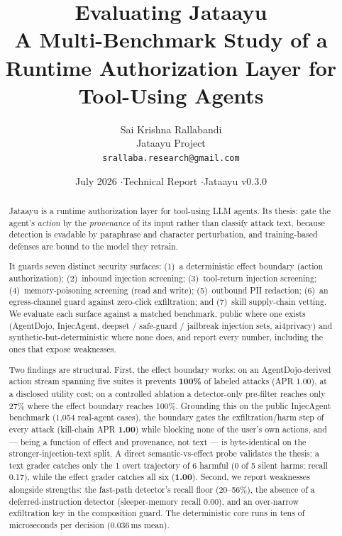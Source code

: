 \documentclass[11pt]{article}
\title{\vspace{-2em}\bfseries Evaluating Jataayu\\[0.2em]
  \large A Multi-Benchmark Study of a Runtime Authorization Layer for Tool-Using Agents}
\author{Sai Krishna Rallabandi\\ \small Jataayu Project \\ \small \texttt{srallaba.research@gmail.com}}
\date{July 2026 \quad$\cdot$\quad Technical Report \quad$\cdot$\quad Jataayu v0.3.0}
\newcommand{\good}[1]{\textcolor{good}{\textbf{#1}}}
\begin{document}
\maketitle

\begin{abstract}
\noindent Jataayu is a runtime authorization layer for tool-using LLM agents. Its thesis: gate the
agent's \emph{action} by the \emph{provenance} of its input rather than classify attack text,
because detection is evadable by paraphrase and character perturbation, and training-based
defenses are bound to the model they retrain.

\smallskip\noindent It guards seven distinct security surfaces: (1)~a deterministic effect
boundary (action authorization); (2)~inbound injection screening; (3)~tool-return injection
screening; (4)~memory-poisoning screening (read and write); (5)~outbound PII redaction; (6)~an
egress-channel guard against zero-click exfiltration; and (7)~skill supply-chain vetting. We
evaluate each surface against a matched benchmark, public where one exists (AgentDojo, InjecAgent,
deepset / safe-guard / jailbreak injection sets, ai4privacy) and synthetic-but-deterministic where
none does, and report every number, including the ones that expose weaknesses.

\smallskip\noindent Two findings are structural. First, the effect boundary works: on an
AgentDojo-derived action stream spanning five suites it prevents \good{100\%} of labeled attacks
(APR 1.00), at a disclosed utility cost; on a controlled ablation a detector-only pre-filter
reaches only 27\% where the effect boundary reaches 100\%. Grounding this on the public InjecAgent
benchmark (1{,}054 real-agent cases), the boundary gates the exfiltration/harm step of every attack
(kill-chain APR \good{1.00}) while blocking none of the user's own actions, and --- being a function
of effect and provenance, not text --- is byte-identical on the stronger-injection-text split. A direct semantic-vs-effect probe
validates the thesis: a text grader catches only the 1 overt trajectory of 6 harmful (0 of 5
silent harms; recall 0.17), while the effect grader catches all six (\good{1.00}). Second, we
report weaknesses alongside strengths: the fast-path detector's recall floor (20--56\%), the
absence of a deferred-instruction detector (sleeper-memory recall 0.00), and an over-narrow
exfiltration key in the composition guard. The deterministic core runs in tens of microseconds per
decision (0.036\,ms mean).
\end{abstract}
\end{document}

